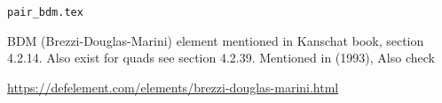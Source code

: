 \begin{flushright} {\tiny {\color{gray} \tt  pair\_bdm.tex}} \end{flushright}

BDM (Brezzi-Douglas-Marini) element mentioned in Kanschat book, section 4.2.14. 
Also exist for quads see section 4.2.39.
Mentioned in \textcite{chen93a} (1993), Also check \textcite{brfo}

\url{https://defelement.com/elements/brezzi-douglas-marini.html}
